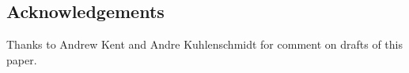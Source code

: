 \subsection*{Acknowledgements}

Thanks to Andrew Kent and Andre Kuhlenschmidt for comment on drafts of this paper.
